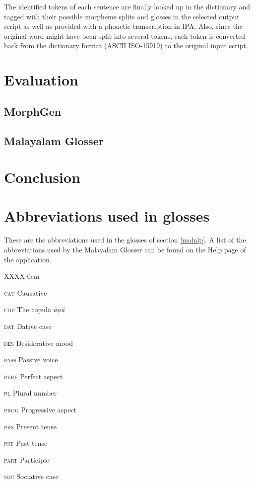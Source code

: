 \documentclass[a4paper]{article}
\begin{document}
The identified tokens of each sentence are finally looked up in the dictionary and tagged with their possible morpheme splits and glosses in the selected output script as well as provided with a phonetic transcription in IPA. Also, since the original word might have been split into several tokens, each token is converted back from the dictionary format (ASCII ISO-15919) to the original input script.


\section{Evaluation}

\subsection{MorphGen}

\subsection{Malayalam Glosser}

\section{Conclusion}

\printbibliography
\clearpage

\appendix

\section{Abbreviations used in glosses}

These are the abbreviations used in the glosses of section \ref{malnlp}. A list of the abbreviations used by the Malayalam Glosser can be found on the Help page of the application.

\begin{multicols}{2}
\begin{labeling}{XXXX}
\itemsep0em
\item [\textsc{cau}] Causative
\item [\textsc{cop}] The copula \textit{āṇŭ}
\item [\textsc{dat}] Dative case
\item [\textsc{des}] Desiderative mood
\item [\textsc{pass}] Passive voice
\item [\textsc{perf}] Perfect aspect
\item [\textsc{pl}] Plural number
\item [\textsc{prog}] Progressive aspect
\item [\textsc{prs}] Present tense
\item [\textsc{pst}] Past tense
\item [\textsc{part}] Participle
\item [\textsc{soc}] Sociative case
\end{labeling}
\end{multicols}
\end{document}
